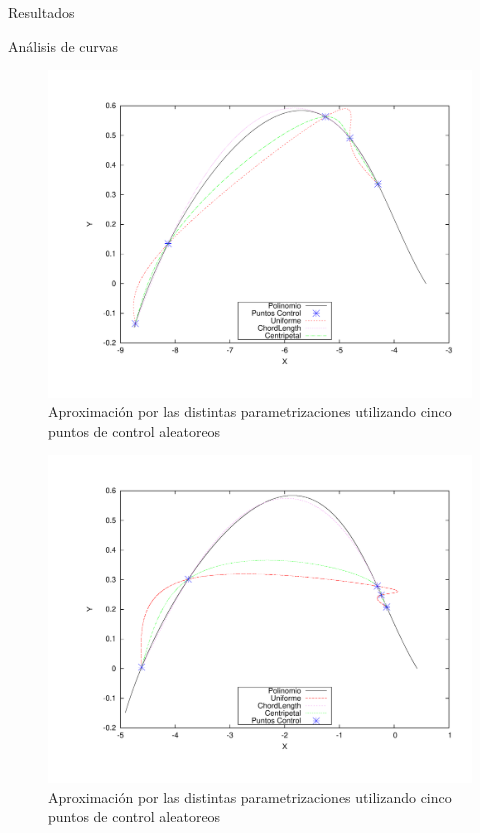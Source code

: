 \begin{section}{Resultados}
\begin{subsection}{Análisis de curvas}
		\begin{figure}[H]
		  \centering
			\includegraphics[width=14cm]{graficos/5p.pdf}
		  \caption{Aproximación por las distintas parametrizaciones utilizando cinco puntos de control aleatoreos}
		  \label{fig:5p}
		\end{figure}
		
		\VSP
		
		\begin{figure}[H]
		  \centering
			\includegraphics[width=14cm]{graficos/5p_r.pdf}
		  \caption{Aproximación por las distintas parametrizaciones utilizando cinco puntos de control aleatoreos}
		  \label{fig:5p_r}
		\end{figure}
		

\end{subsection}
\end{section}
